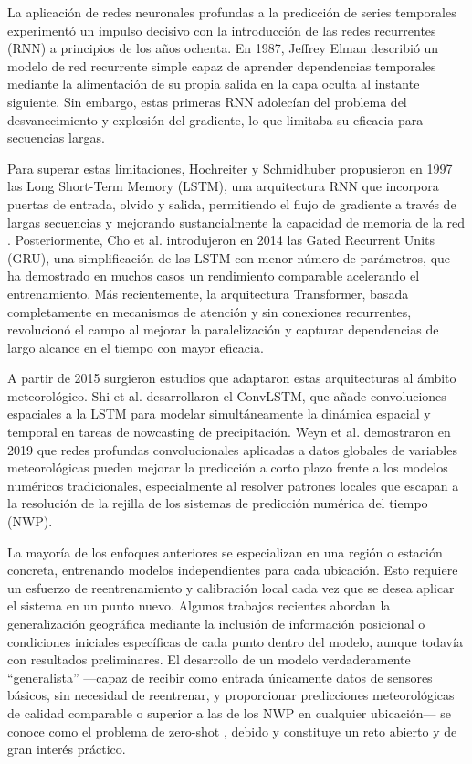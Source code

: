 La aplicación de redes neuronales profundas a la predicción de series temporales experimentó un impulso decisivo con la introducción de las redes recurrentes (RNN)
a principios de los años ochenta. En 1987, Jeffrey Elman describió un modelo de red recurrente simple capaz de aprender dependencias temporales mediante la alimentación
de su propia salida en la capa oculta al instante siguiente\cite{elman1990}. Sin embargo, estas primeras RNN adolecían del problema del desvanecimiento y explosión del gradiente, lo
que limitaba su eficacia para secuencias largas.

Para superar estas limitaciones, Hochreiter y Schmidhuber propusieron en 1997 las Long Short-Term Memory (LSTM), una arquitectura RNN que incorpora puertas de entrada,
olvido y salida, permitiendo el flujo de gradiente a través de largas secuencias y mejorando sustancialmente la capacidad de memoria de la red \cite{hochreiter1997}.
Posteriormente, Cho et al. introdujeron en 2014 las Gated Recurrent Units (GRU), una simplificación de las LSTM con menor número de parámetros,
que ha demostrado en muchos casos un rendimiento comparable acelerando el entrenamiento\cite{cho2014}. 
Más recientemente, la arquitectura Transformer, basada completamente en mecanismos de atención y sin conexiones recurrentes, revolucionó el campo al
mejorar la paralelización y capturar dependencias de largo alcance en el tiempo con mayor eficacia\cite{vaswani2017}.

A partir de 2015 surgieron estudios que adaptaron estas arquitecturas al ámbito meteorológico. Shi et al. desarrollaron el ConvLSTM, que añade convoluciones espaciales a
la LSTM para modelar simultáneamente la dinámica espacial y temporal en tareas de nowcasting de precipitación\cite{shi2015}. Weyn et al. demostraron en 2019 que redes
profundas convolucionales aplicadas a datos globales de variables meteorológicas pueden mejorar la predicción a corto plazo frente a los modelos numéricos tradicionales,
especialmente al resolver patrones locales que escapan a la resolución de la rejilla de los sistemas de predicción numérica del tiempo (NWP)\cite{weyn2019}.

La mayoría de los enfoques anteriores se especializan en una región o estación concreta, entrenando modelos independientes para cada ubicación. Esto requiere un esfuerzo de
reentrenamiento y calibración local cada vez que se desea aplicar el sistema en un punto nuevo. Algunos trabajos recientes abordan la generalización geográfica mediante la
 inclusión de información posicional o condiciones iniciales específicas de cada punto dentro del modelo, aunque todavía con resultados preliminares\cite{fu2019}. 
El desarrollo de un modelo verdaderamente “generalista” —capaz de recibir como entrada únicamente datos de sensores básicos, sin necesidad de reentrenar, y proporcionar predicciones meteorológicas
de calidad comparable o superior a las de los NWP en cualquier ubicación— se conoce como el problema de zero-shot \cite{deznabi2024}, debido 
y constituye un reto abierto y de gran interés práctico.

